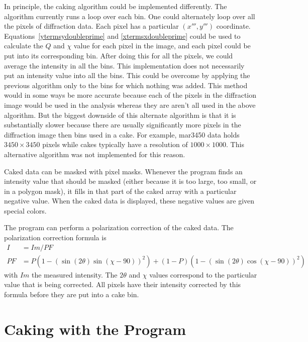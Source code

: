 In principle, the caking algorithm could be implemented
differently. The algorithm currently runs a loop over
each bin. One could alternately loop over
all the pixels of diffraction data. Each pixel has a
particular $(x''',y''')$ coordinate. 
Equations~\ref{ytermsydoubleprime} and
\ref{xtermsxdoubleprime} could be used to calculate the $Q$
and $\chi$ value for each pixel in the image, and each
pixel could be put into its corresponding bin.
After doing this for all the pixels, we could average the
intensity in all the bins.  
This implementation does not necessarily put an intensity value 
into all the bins. This could be overcome by applying
the previous algorithm only to the bins for which
nothing was added. 
This method would in some ways 
be more accurate because each of the pixels in the diffraction 
image would be used in the analysis
whereas they are aren't all used in the above algorithm.
But the biggest downside of this alternate 
algorithm is that it is substantially slower because there
are usually significantly more pixels in the diffraction
image then bins used in a cake. For example, mar3450 data
holds $3450\times 3450$ pixels while cakes typically 
have a resolution of $1000\times 1000$. 
This alternative algorithm was not implemented for this
reason.

Caked data can be masked with pixel masks.
Whenever the program finds an intensity value
that should be masked (either because it is too 
large, too small, or in a polygon mask), it fills
in that part of the caked array with a particular 
negative value. When the caked data is displayed,
these negative values are given special colors.

The program can perform a polarization correction of
the caked data. The polarization 
correction formula is
\begin{align}
    I&=Im/PF \\ 
    PF&=P(1 - (\sin(2\theta)\sin(\chi-90))^2) + 
    (1 - P)(1 - (\sin(2\theta)\cos(\chi-90))^2)
\end{align}
with $Im$ the measured intensity. The $2\theta$ and $\chi$
values correspond to the particular value that is being 
corrected. All pixels have their 
intensity corrected by this formula before they
are put into a cake bin. 

\section{Caking with the Program}

